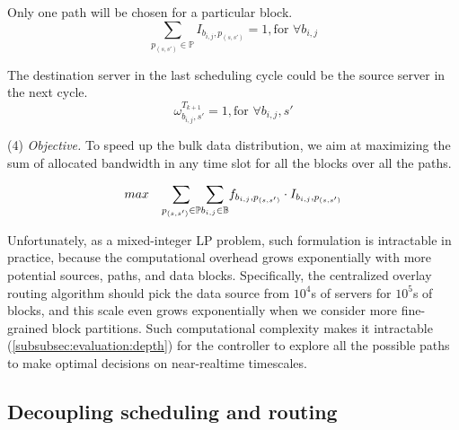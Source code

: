 \begin{packeditemize}
\item Only one path will be chosen for a particular block.
\begin{equation}
\displaystyle{\sum_{p_{(s,s')} \in \mathbb{P}}} I_{b_{i,j},p_{(s,s')}} = 1, \text{for }\forall b_{i,j}
\end{equation}


\item The destination server in the last scheduling cycle could be the source server in the next cycle.
\begin{equation}
\omega^{T_{k+1}}_{b_{i,j},s'} = 1, \text{for }\forall b_{i,j}, s'
\end{equation}
\end{packeditemize}


\noindent(4) {\em Objective.} To speed up the bulk data distribution, we aim at maximizing the sum of allocated bandwidth in any time slot for all the blocks over all the paths.

\begin{equation}
\centering
max \quad \displaystyle{\sum_{p_{(s,s')}\in \mathbb{P}}} \displaystyle{\sum_{b_{i,j} \in \mathbb{B}}} f_{b_{i,j},p_{(s,s')}} \cdot I_{b_{i,j},p_{(s,s')}}
\label{equation:objective}
\end{equation}

Unfortunately, as a mixed-integer LP problem, such formulation is intractable in practice, because the computational overhead grows exponentially with more potential sources, paths, and data blocks. Specifically, the centralized overlay routing algorithm should pick the data source from $10^4$s of servers for $10^5$s of blocks, and this scale even grows exponentially when we consider more fine-grained block partitions. Such computational complexity makes it intractable (\Section\ref{subsubsec:evaluation:depth}) for the controller to explore all the possible paths to make optimal decisions on near-realtime timescales.


\subsection{Decoupling scheduling and routing}
\label{subsec:logic:separation}

